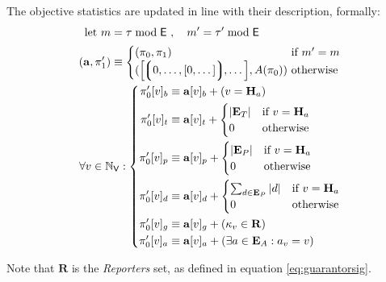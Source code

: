 
The objective statistics are updated in line with their description, formally:
\begin{align}
    \using m =\; &\tau \bmod \mathsf{E} \ ,\quad m' = \tau' \bmod \mathsf{E}\\
    (\mathbf{a}, \pi'_1) \equiv\;&\begin{cases}
        (\pi_0, \pi_1) &\when m' = m \\
        (\sq{\tuple{0, \dots, [0, \dots]}, \dots}, A(\pi_0))\!\!\!\! &\otherwise
    \end{cases}\!\!\!\!\\
    \forall v \in \N_\mathsf{V} :&\; \left\{\begin{aligned}
        \pi'_0[v]_b &\equiv \mathbf{a}[v]_b + (v = \mathbf{H}_a)\\
        \pi'_0[v]_t &\equiv \mathbf{a}[v]_t + \begin{cases}
            |\mathbf{E}_T| &\when v = \mathbf{H}_a \\
            0 &\otherwise
        \end{cases}\\
        \pi'_0[v]_p &\equiv \mathbf{a}[v]_p + \begin{cases}
            |\mathbf{E}_P| &\when v = \mathbf{H}_a \\
            0 &\otherwise
        \end{cases}\\
        \pi'_0[v]_d &\equiv \mathbf{a}[v]_d + \begin{cases}
            \sum_{d \in \mathbf{E}_P}|d| &\when v = \mathbf{H}_a \\
            0 &\otherwise
        \end{cases}\\
        \pi'_0[v]_g &\equiv \mathbf{a}[v]_g + (\kappa_v \in \mathbf{R})\\
        \pi'_0[v]_a &\equiv \mathbf{a}[v]_a + (\exists a \in \mathbf{E}_A : a_v = v)
    \end{aligned}\right.
\end{align}

Note that $\mathbf{R}$ is the \emph{Reporters} set, as defined in equation \ref{eq:guarantorsig}.